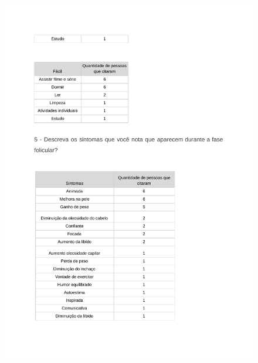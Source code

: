\begin{apendicesenv}
        \begin{figure}[ht]
            \centering
            \includegraphics[keepaspectratio=true,scale=0.7]{figuras/Tab18.pdf}
        \end{figure}
        

\end{apendicesenv}
